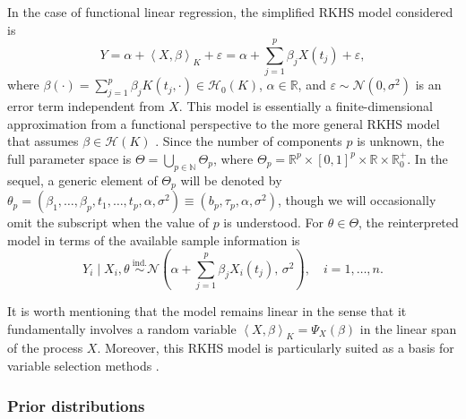 \documentclass{article}
\numberwithin{equation}{section}
\theoremstyle{plain}
\theoremstyle{definition}
\renewcommand{\epsilon}{\varepsilon}
\newcommand{\N}{\mathbb{N}}
\newcommand{\R}{\mathbb{R}}
\newcommand{\Hcal}{\mathcal{H}}
\newcommand\dotprod[2]{\left\langle#1,#2\right\rangle}
\begin{document}
In the case of functional linear regression, the simplified RKHS model considered is
\[
  Y = \alpha + \dotprod{X}{\beta}_K + \epsilon = \alpha + \sum_{j=1}^p \beta_j X(t_j) + \epsilon,
\]
where \(\beta(\cdot)=\sum_{j=1}^p\beta_j K(t_j, \cdot) \in \Hcal_0(K)\), \(\alpha\in\R\), and \(\epsilon \sim \mathcal N(0,\sigma^2)\) is an error term independent from \(X\). This model is essentially a finite-dimensional approximation from a functional perspective to the more general RKHS model that assumes \(\beta \in \Hcal(K)\) \citep{berrendero2024functional}. Since the number of components \(p\) is unknown, the full parameter space is \(\Theta = \bigcup_{p\in\N}\Theta_p\), where \(\Theta_p = \R^p \times [0, 1]^p \times \R \times \R^+_0\). In the sequel, a generic element of \(\Theta_p\) will be denoted by \(\theta_p = (\beta_1,\dots, \beta_p, t_1,\dots, t_p, \alpha, \sigma^2) \equiv (b_p, \tau_p, \alpha, \sigma^2)\), though we will occasionally omit the subscript when the value of \(p\) is understood. For \(\theta \in \Theta\), the reinterpreted model in terms of the available sample information is
\begin{equation}\label{eq:rkhs-model-linear-2}
  Y_i \mid X_i, \theta \ \stackrel{\text{ind.}}{\sim} \mathcal N\left(\alpha + \sum_{j=1}^p \beta_j X_i(t_j),\, \sigma^2\right), \quad i =1,\dots, n.
\end{equation}

It is worth mentioning that the model remains linear in the sense that it fundamentally involves a random variable \(\dotprod{X}{\beta}_K = \Psi_X(\beta)\) in the linear span of the process \(X\). Moreover, this RKHS model is particularly suited as a basis for variable selection methods \citep[see][]{berrendero2019rkhs}.

\subsubsection*{Prior distributions}
\end{document}

